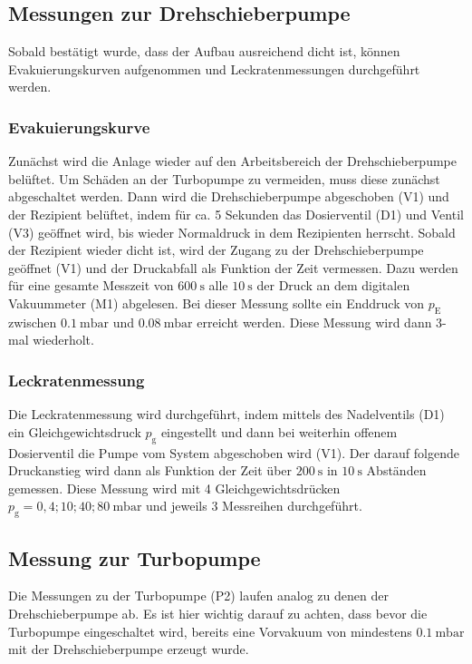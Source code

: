 	\subsection{Messungen zur Drehschieberpumpe}

		Sobald bestätigt wurde, dass der Aufbau ausreichend dicht ist, können Evakuierungskurven aufgenommen und Leckratenmessungen durchgeführt werden.

		\subsubsection{Evakuierungskurve}

			Zunächst wird die Anlage wieder auf den Arbeitsbereich der Drehschieberpumpe belüftet. 
			Um Schäden an der Turbopumpe zu vermeiden, muss diese zunächst abgeschaltet werden. 
			Dann wird die Drehschieberpumpe abgeschoben (V1) und der Rezipient belüftet, 
			indem für ca. 5 Sekunden das Dosierventil (D1) und Ventil (V3) geöffnet wird, 
			bis wieder Normaldruck in dem Rezipienten herrscht. 
			Sobald der Rezipient wieder dicht ist, wird der Zugang zu der Drehschieberpumpe geöffnet (V1) und der Druckabfall als Funktion der Zeit vermessen. 
			Dazu werden für eine gesamte Messzeit von $\SI{600}{\second}$ alle $\SI{10}{\second}$ der Druck an dem digitalen Vakuummeter (M1) abgelesen.
			Bei dieser Messung sollte ein Enddruck von $p_\text{E}$ zwischen $\SI{0.1}{\milli\bar}$ und $\SI{0.08}{\milli\bar}$ erreicht werden.
			Diese Messung wird dann 3-mal wiederholt.

		\subsubsection{Leckratenmessung}

		 	Die Leckratenmessung wird durchgeführt, indem mittels des Nadelventils (D1) ein Gleichgewichtsdruck $p_\text{g}$ eingestellt und dann bei weiterhin offenem Dosierventil die Pumpe vom System abgeschoben wird (V1).
			Der darauf folgende Druckanstieg wird dann als Funktion der Zeit über $\SI{200}{\second}$ in $\SI{10}{\second}$ Abständen gemessen. 
			Diese Messung wird mit 4 Gleichgewichtsdrücken $p_\text{g} = 0,4; 10; 40; \SI{80}{\milli\bar}$ und jeweils 3 Messreihen durchgeführt.

	\subsection{Messung zur Turbopumpe}

		Die Messungen zu der Turbopumpe (P2) laufen analog zu denen der Drehschieberpumpe ab. 
		Es ist hier wichtig darauf zu achten, dass bevor die Turbopumpe eingeschaltet wird,
	    bereits eine Vorvakuum von mindestens $\SI{0.1}{\milli\bar}$ mit der Drehschieberpumpe erzeugt wurde.
		
